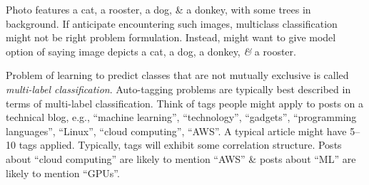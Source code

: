 \documentclass{article}
\begin{document}
\begin{itemize}
\begin{itemize}
\begin{itemize}
\begin{itemize}
				Photo features a cat, a rooster, a dog, \& a donkey, with some trees in background. If anticipate encountering such images, multiclass classification might not be right problem formulation. Instead, might want to give model option of saying image depicts a cat, a dog, a donkey, {\it\&} a rooster.
				
				Problem of learning to predict classes that are not mutually exclusive is called {\it multi-label classification}. Auto-tagging problems are typically best described in terms of multi-label classification. Think of tags people might apply to posts on a technical blog, e.g., ``machine learning'', ``technology'', ``gadgets'', ``programming languages'', ``Linux'', ``cloud computing'', ``AWS''. A typical article might have 5--10 tags applied. Typically, tags will exhibit some correlation structure. Posts about ``cloud computing'' are likely to mention ``AWS'' \& posts about ``ML'' are likely to mention ``GPUs''.
				

\end{itemize}
\end{itemize}
\end{itemize}
\end{itemize}
\end{document}
